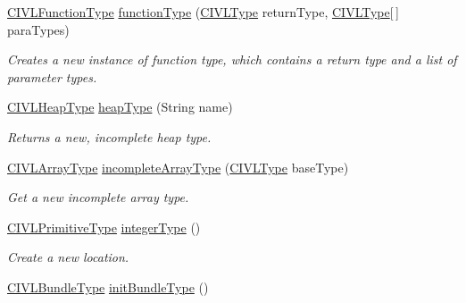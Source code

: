 \begin{DoxyCompactItemize}
\hyperlink{interfaceedu_1_1udel_1_1cis_1_1vsl_1_1civl_1_1model_1_1IF_1_1type_1_1CIVLFunctionType}{C\+I\+V\+L\+Function\+Type} \hyperlink{classedu_1_1udel_1_1cis_1_1vsl_1_1civl_1_1model_1_1common_1_1CommonCIVLTypeFactory_ab7c4630a44524cef59b4c4e3cde5f6e7}{function\+Type} (\hyperlink{interfaceedu_1_1udel_1_1cis_1_1vsl_1_1civl_1_1model_1_1IF_1_1type_1_1CIVLType}{C\+I\+V\+L\+Type} return\+Type, \hyperlink{interfaceedu_1_1udel_1_1cis_1_1vsl_1_1civl_1_1model_1_1IF_1_1type_1_1CIVLType}{C\+I\+V\+L\+Type}\mbox{[}$\,$\mbox{]} para\+Types)
\begin{DoxyCompactList}\small\item\em Creates a new instance of function type, which contains a return type and a list of parameter types. \end{DoxyCompactList}\item 
\hyperlink{interfaceedu_1_1udel_1_1cis_1_1vsl_1_1civl_1_1model_1_1IF_1_1type_1_1CIVLHeapType}{C\+I\+V\+L\+Heap\+Type} \hyperlink{classedu_1_1udel_1_1cis_1_1vsl_1_1civl_1_1model_1_1common_1_1CommonCIVLTypeFactory_aa844143c5cd11cd4c64851d48ec3745f}{heap\+Type} (String name)
\begin{DoxyCompactList}\small\item\em Returns a new, incomplete heap type. \end{DoxyCompactList}\item 
\hyperlink{interfaceedu_1_1udel_1_1cis_1_1vsl_1_1civl_1_1model_1_1IF_1_1type_1_1CIVLArrayType}{C\+I\+V\+L\+Array\+Type} \hyperlink{classedu_1_1udel_1_1cis_1_1vsl_1_1civl_1_1model_1_1common_1_1CommonCIVLTypeFactory_a0c6c4d2a815ee532e3807f4b783afae0}{incomplete\+Array\+Type} (\hyperlink{interfaceedu_1_1udel_1_1cis_1_1vsl_1_1civl_1_1model_1_1IF_1_1type_1_1CIVLType}{C\+I\+V\+L\+Type} base\+Type)
\begin{DoxyCompactList}\small\item\em Get a new incomplete array type. \end{DoxyCompactList}\item 
\hyperlink{interfaceedu_1_1udel_1_1cis_1_1vsl_1_1civl_1_1model_1_1IF_1_1type_1_1CIVLPrimitiveType}{C\+I\+V\+L\+Primitive\+Type} \hyperlink{classedu_1_1udel_1_1cis_1_1vsl_1_1civl_1_1model_1_1common_1_1CommonCIVLTypeFactory_af8edd45665c8c5a802cdea9146ee1bec}{integer\+Type} ()
\begin{DoxyCompactList}\small\item\em Create a new location. \end{DoxyCompactList}\item 
\hyperlink{interfaceedu_1_1udel_1_1cis_1_1vsl_1_1civl_1_1model_1_1IF_1_1type_1_1CIVLBundleType}{C\+I\+V\+L\+Bundle\+Type} \hyperlink{classedu_1_1udel_1_1cis_1_1vsl_1_1civl_1_1model_1_1common_1_1CommonCIVLTypeFactory_ae8bc5dcf2bc379fdcc302150e65ff8f0}{init\+Bundle\+Type} ()

\end{DoxyCompactItemize}
